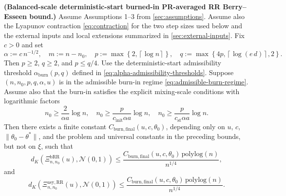 \begin{theorem}\label{thm:burn-final-balanced}
  \textbf{(Balanced-scale deterministic-start burned-in PR-averaged RR Berry--Esseen bound.)}
  Assume Assumptions 1--3 from \cref{sec:assumptions}. Assume also the Lyapunov
  contraction \eqref{eq:contraction} for the two step sizes used below and the
  external inputs and local extensions summarized in \cref{sec:external-inputs}.
  Fix $c > 0$ and set
  \[
\alpha := c \, n^{-1 / 2},
  \quad
  m := n - n_{0},
  \quad
  p := \max\left\{2, \left\lceil \log n \right\rceil\right\},
  \quad
  q := \max\left\{4 p, \left\lceil \log\left(e \, d\right) \right\rceil, 2\right\}.
\]
  Then $p \ge 2$, $q \ge 2$, and $p \le q / 4$.
  Use the deterministic-start admissibility threshold
  $\alpha_{\mathrm{burn}}(p,q)$ defined in \eqref{eq:alpha-admissibility-thresholds}.
  Suppose $(n,n_{0},p,q,\alpha,u)$ is in the admissible burn-in regime
  \eqref{eq:admissible-burn-regime}.
  Assume also that the burn-in satisfies the explicit mixing-scale conditions
  with logarithmic factors
  \begin{equation}
n_{0} \ge \frac{2}{\alpha a} \log n,
  \quad
  n_{0} \ge \frac{p}{c_{\mathrm{init}} \alpha a} \log n,
  \quad
  n_{0} \ge \frac{p}{c_{\mathrm{st}} \alpha a} \log n.
\label{eq:burn-final-log-conditions}
\end{equation}
  Then there exists a finite constant $C_{\mathrm{burn,final}}(u,c,\theta_{0})$,
  depending only on $u$, $c$, $\lVert \theta_{0} - \theta^{*} \rVert$, and the problem and
  universal constants in the preceding bounds, but not on $\xi$, such that
  \begin{equation}
d_{K} \left( \Xi_{n,n_{0}}^{\mathrm{bRR}}(u), \mathcal{N}(0, 1) \right)
    \le \frac{C_{\mathrm{burn,final}}(u,c,\theta_{0}) \, \mathrm{polylog}(n)}{n^{1 / 4}},
\label{eq:burn-final-finite-window}
\end{equation}
  and
  \begin{equation}
d_{K} \left( \Xi_{n,n_{0}}^{\mathrm{asy,RR}}(u), \mathcal{N}(0, 1) \right)
    \le \frac{C_{\mathrm{burn,final}}(u,c,\theta_{0}) \, \mathrm{polylog}(n)}{n^{1 / 4}}.
\label{eq:burn-final-asymptotic}
\end{equation}
\end{theorem}

